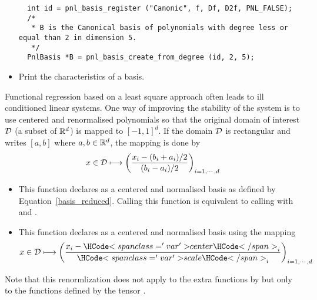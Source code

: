 \begin{itemize}
\begin{lstlisting}
  int id = pnl_basis_register ("Canonic", f, Df, D2f, PNL_FALSE);
  /*
   * B is the Canonical basis of polynomials with degree less or equal than 2 in dimension 5.
   */
  PnlBasis *B = pnl_basis_create_from_degree (id, 2, 5);
  \end{lstlisting}

\item {}
  \sshortdescribe Print the characteristics of a basis.

\end{itemize}


Functional regression based on a least square approach often leads to ill conditioned linear systems. One way of improving the stability of the system is to use centered and renormalised polynomials so that the original domain of interest ${\mathcal D}$ (a subset of ${\mathbb R}^d$) is mapped to $[-1,1]^d$. If the domain ${\mathcal D}$ is rectangular and writes $[a, b]$ where $a,b \in {\mathbb R}^d$, the mapping is done by 
\begin{equation}
  \label{basis_reduced}
  x \in {\mathcal D} \longmapsto \left(\frac{x_i - (b_i+a_i)/2}{(b_i - a_i)/2}
  \right)_{i=1,\cdots,d}
\end{equation}
\begin{itemize}
\item {}
  \sshortdescribe This function declares  as a centered and normalised basis
  as defined by Equation~\ref{basis_reduced}. Calling this function is equivalent to
  calling  with  and
  .
\item {}
  \sshortdescribe This function declares  as a centered and normalised basis
  using the mapping
  \begin{equation*}
    x \in \cD \longmapsto \left(\frac{x_i - \var{center}_i }{\var{scale}_i}
    \right)_{i=1,\cdots,d}
  \end{equation*}
\end{itemize}
Note that this renormlization does not apply to the extra functions by  but only to the functions defined by the tensor .


